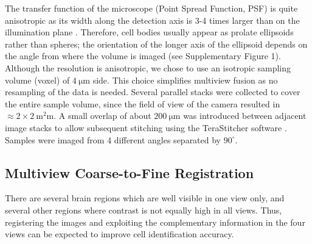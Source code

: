\documentclass[smallextended]{svjour3}       %
\begin{document}
The transfer function of the microscope (Point Spread Function, PSF) is quite anisotropic as its width
along the detection axis is 3-4 times larger than on the illumination plane \cite{silvestri_confocal_2012}. Therefore,
cell bodies usually appear as prolate ellipsoids rather than spheres; the orientation of the longer axis of the ellipsoid
depends on the angle from where the volume is imaged (see Supplementary Figure 1).
Although the resolution is anisotropic, we chose to use an isotropic sampling volume (voxel) of $\SI{4}{\micro\meter}$ side.
This choice simplifies multiview fusion as no resampling of the data is needed.
Several parallel stacks were
collected to cover the entire sample volume, since the field of view of the camera resulted in
$\approx 2 \times \SI{2}{\square\milli\meter}$. A small overlap of about $\SI{200}{\micro\meter}$ was introduced
between adjacent image stacks to allow subsequent stitching using the TeraStitcher software
\cite{bria_terastitcher-tool_2011}. Samples were imaged from 4 different angles separated by $90^\circ$.





\subsection{Multiview Coarse-to-Fine Registration}
\label{sec:registration}





There are several brain regions which are well visible in one view
only, and several other regions where contrast is not equally high in
all views. Thus, registering the images and exploiting the
complementary information in the four views can be expected to improve
cell identification accuracy.
\end{document}
